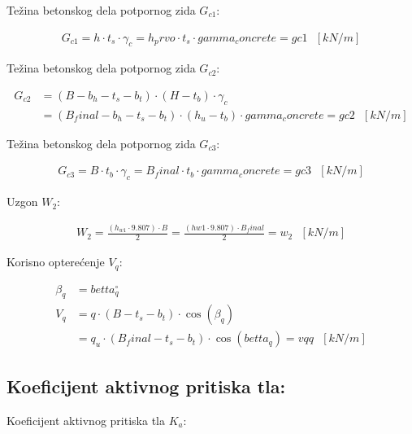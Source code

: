 \documentclass[a4paper, 11pt]{article}
\begin{document}

Te\v{z}ina betonskog dela potpornog zida $G_{c1}$:

\begin{align*}
G_{c1} = h \cdot t_{s} \cdot \gamma_{c} = h_prvo \cdot t_s \cdot gamma_concrete = gc1 \text{ } [kN/m]
\end{align*}

Te\v{z}ina betonskog dela potpornog zida $G_{c2}$:

\begin{align*}
G_{c2} &= (B - b_{h} - t_{s} - b_{t}) \cdot (H-t_{b}) \cdot \gamma_{c} \\
	   &= (B_final - b_h - t_s - b_t) \cdot (h_u - t_b) \cdot gamma_concrete = gc2 \text{ } [kN/m]
\end{align*}

Te\v{z}ina betonskog dela potpornog zida $G_{c3}$:

\begin{align*}
G_{c3} = B \cdot t_{b} \cdot \gamma_c = B_final \cdot t_b \cdot gamma_concrete = gc3 \text{ } [kN/m]
\end{align*}

Uzgon $W_{2}$:

\begin{align*}
W_{2} = \frac{(h_{w1} \cdot 9.807) \cdot B}{2} = \frac{(hw1 \cdot 9.807) \cdot B_final}{2} = w_2 \text{ } [kN/m]
\end{align*}
 
 
Korisno optere\'cenje $V_{q}$:

\begin{align*}
\beta_{q} &= betta_q ^\circ \\
V_{q} &= q \cdot  ( B - t_{s} - b_{t}) \cdot \cos(\beta_{q})  \\
      &= q_u \cdot (B_final - t_s - b_t) \cdot \cos(betta_q) = vqq \text{ } [kN/m]
\end{align*}



\subsection*{Koeficijent aktivnog pritiska tla:}

Koeficijent aktivnog pritiska tla $K_{a}$:
\end{document}
